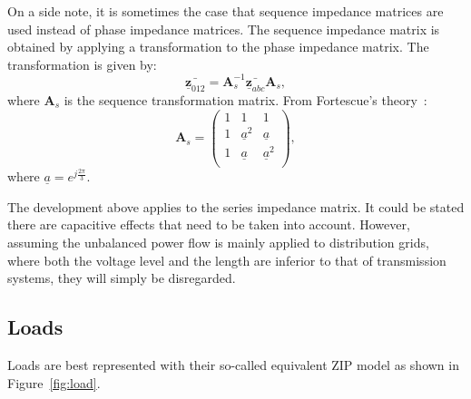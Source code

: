 \documentclass[11pt]{article}
\begin{document}
	On a side note, it is sometimes the case that sequence impedance matrices are used instead of phase impedance matrices. The sequence impedance matrix is obtained by applying a transformation to the phase impedance matrix. The transformation is given by:
	\begin{equation}
		\bar{\underline{\bm{z}}_{012}} = \bm{A}_s^{-1} \bar{\underline{\bm{z}}_{abc}} \bm{A}_s,
	\end{equation}
	where $\bm{A}_s$ is the sequence transformation matrix. From Fortescue's theory~\cite{fortescue1918method}: 
	\begin{equation}
		\bm{A}_s = \begin{pmatrix}
			1 & 1 & 1 \\
			1 & \underline{a}^2 & \underline{a} \\
			1 & \underline{a} & \underline{a}^2 \\
		\end{pmatrix},
	\end{equation}
	where $\underline{a}=e^{j\frac{2\pi}{3}}$.

	The development above applies to the series impedance matrix. It could be stated there are capacitive effects that need to be taken into account. However, assuming the unbalanced power flow is mainly applied to distribution grids, where both the voltage level and the length are inferior to that of transmission systems, they will simply be disregarded. 



	\subsection{Loads}
	Loads are best represented with their so-called equivalent ZIP model as shown in Figure~\ref{fig:load}. 
\end{document}
